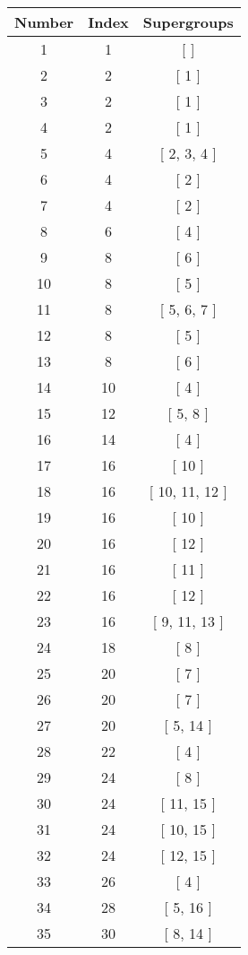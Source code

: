 \begin{center}
\begin{longtable}[H]{|| c c c ||}
\hline
Number & Index & Supergroups \\ 
\hline
1 & 1 & [ ] \\ 
\hline
2 & 2 & [ 1 ] \\ 
\hline
3 & 2 & [ 1 ] \\ 
\hline
4 & 2 & [ 1 ] \\ 
\hline
5 & 4 & [ 2, 3, 4 ] \\ 
\hline
6 & 4 & [ 2 ] \\ 
\hline
7 & 4 & [ 2 ] \\ 
\hline
8 & 6 & [ 4 ] \\ 
\hline
9 & 8 & [ 6 ] \\ 
\hline
10 & 8 & [ 5 ] \\ 
\hline
11 & 8 & [ 5, 6, 7 ] \\ 
\hline
12 & 8 & [ 5 ] \\ 
\hline
13 & 8 & [ 6 ] \\ 
\hline
14 & 10 & [ 4 ] \\ 
\hline
15 & 12 & [ 5, 8 ] \\ 
\hline
16 & 14 & [ 4 ] \\ 
\hline
17 & 16 & [ 10 ] \\ 
\hline
18 & 16 & [ 10, 11, 12 ] \\ 
\hline
19 & 16 & [ 10 ] \\ 
\hline
20 & 16 & [ 12 ] \\ 
\hline
21 & 16 & [ 11 ] \\ 
\hline
22 & 16 & [ 12 ] \\ 
\hline
23 & 16 & [ 9, 11, 13 ] \\ 
\hline
24 & 18 & [ 8 ] \\ 
\hline
25 & 20 & [ 7 ] \\ 
\hline
26 & 20 & [ 7 ] \\ 
\hline
27 & 20 & [ 5, 14 ] \\ 
\hline
28 & 22 & [ 4 ] \\ 
\hline
29 & 24 & [ 8 ] \\ 
\hline
30 & 24 & [ 11, 15 ] \\ 
\hline
31 & 24 & [ 10, 15 ] \\ 
\hline
32 & 24 & [ 12, 15 ] \\ 
\hline
33 & 26 & [ 4 ] \\ 
\hline
34 & 28 & [ 5, 16 ] \\ 
\hline
35 & 30 & [ 8, 14 ] \\ 
\hline

\end{longtable}
\end{center}
